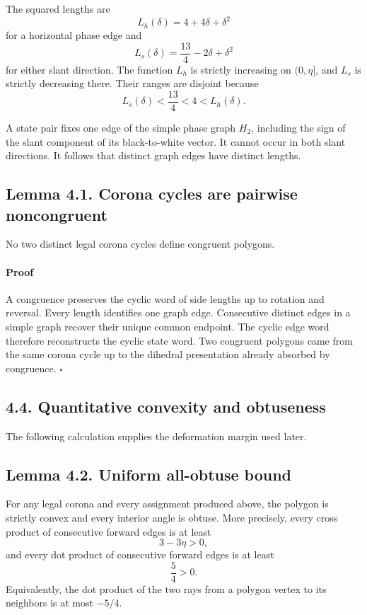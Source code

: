 \documentclass[11pt]{article}
\begin{document}
The squared lengths are
\[
  L_h(\delta)=4+4\delta+\delta^2
\]
for a horizontal phase edge and
\[
  L_s(\delta)=\frac{13}{4}-2\delta+\delta^2
\]
for either slant direction. The function \(L_h\) is strictly increasing on
\((0,\eta]\), and \(L_s\) is strictly decreasing there. Their ranges are
disjoint because
\[
  L_s(\delta)<\frac{13}{4}<4<L_h(\delta).
\]

A state pair fixes one edge of the simple phase graph \(H_2\), including the
sign of the slant component of its black-to-white vector. It cannot occur in
both slant directions. It follows that distinct graph edges have distinct
lengths.

\subsection*{Lemma 4.1. Corona cycles are pairwise noncongruent}

No two distinct legal corona cycles define congruent polygons.

\paragraph{Proof}

A congruence preserves the cyclic word of side lengths up to rotation and
reversal. Every length identifies one graph edge. Consecutive distinct edges
in a simple graph recover their unique common endpoint. The cyclic edge word
therefore reconstructs the cyclic state word. Two congruent polygons came
from the same corona cycle up to the dihedral presentation already absorbed
by congruence. \(\square\)

\subsection*{4.4. Quantitative convexity and obtuseness}

The following calculation supplies the deformation margin used later.

\subsection*{Lemma 4.2. Uniform all-obtuse bound}

For any legal corona and every assignment produced above, the polygon is
strictly convex and every interior angle is obtuse. More precisely, every
cross product of consecutive forward edges is at least
\[
  3-3\eta>0,
\]
and every dot product of consecutive forward edges is at least
\[
  \frac54>0.
\]
Equivalently, the dot product of the two rays from a polygon vertex to its
neighbors is at most \(-5/4\).
\end{document}
